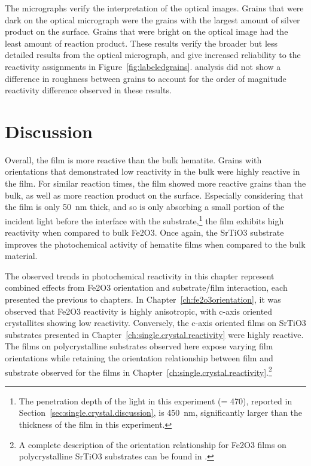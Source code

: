 \documentclass[12pt,%
              twoside,
               letterpaper]{uiothesis}
\begin{document}
The  micrographs verify the interpretation of the optical images. Grains that
were dark on the optical micrograph were the grains with the largest amount of silver
product on the surface. Grains that were bright on the optical image had the least amount
of reaction product. These results verify the broader but less detailed results from the
optical micrograph, and give increased reliability to the reactivity assignments in
Figure~\ref{fig:labeledgrains}.  analysis did not show a difference in roughness
between grains to account for the order of magnitude reactivity difference observed in
these results.


\section{Discussion}
\label{sec:poly.reac.discussion}


Overall, the film is more reactive than the bulk hematite. Grains with orientations that
demonstrated low reactivity in the bulk were highly reactive in the film. For similar
reaction times, the film showed more reactive grains than the bulk, as well as more
reaction product on the surface. Especially considering that the film is only
\SI{50}{\nano\meter} thick, and so is only absorbing a small portion of the incident light
before the interface with the substrate,\footnote{The penetration depth of the light in
this experiment (\textlambda = \si{470}{\nano\meter}), reported in
Section~\ref{sec:single.crystal.discussion}, is \texttildelow\SI{450}{\nano\meter},
significantly larger than the thickness of the film in this experiment.} the film exhibits
high reactivity when compared to bulk Fe2O3. Once again, the SrTiO3 substrate
improves the photochemical activity of hematite films when compared to the bulk material.

The observed trends in photochemical reactivity in this chapter represent combined effects
from Fe2O3 orientation and substrate/film interaction, each presented the previous to
chapters. In Chapter~\ref{ch:fe2o3orientation}, it was observed that Fe2O3 reactivity is
highly anisotropic, with c-axis oriented crystallites showing low reactivity. Conversely,
the c-axis oriented films on SrTiO3 substrates presented in
Chapter~\ref{ch:single.crystal.reactivity} were highly reactive. The films on polycrystalline
substrates observed here expose varying film orientations while retaining the orientation
relationship between film and substrate observed for the films in
Chapter~\ref{ch:single.crystal.reactivity}.\footnote{A complete description of the orientation
relationship for Fe2O3 films on polycrystalline SrTiO3 substrates can be found
in .}
\end{document}
